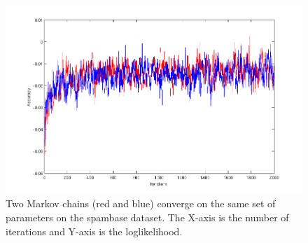 \begin{figure}[hbt]
\includegraphics[width=1.1\textwidth]{results/KSsampleChain.png}
\caption{Two Markov chains (red and blue) converge on the same set of
parameters on the spambase dataset. The
X-axis is the number of iterations and Y-axis is the loglikelihood.}
\label{fig:MCMCconverge}
\end{figure}
